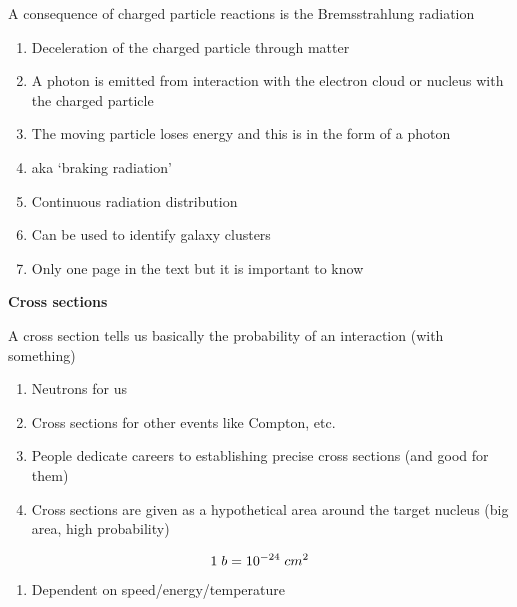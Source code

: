 \documentclass[aspectratio=1610,pdftex,dvipsnames,compress,xcolor={dvipsnames}]{beamer}
\begin{document}
\addtocounter{framenumber}{-1} 
\begin{frame}{A consequence of charged particle reactions is the Bremsstrahlung radiation}
    \begin{enumerate}[series=outerlist,topsep=0pt,itemsep=21pt,leftmargin=*,label=(\arabic*)]
        \item[]Deceleration of the charged particle through matter
        \item[]A photon is emitted from interaction with the electron cloud or nucleus with the charged particle
        \item[]The moving particle loses energy and this is in the form of a photon
        \item[]aka `braking radiation'
        \item[]Continuous radiation distribution
        \item[]Can be used to identify galaxy clusters
        \item[]Only one page in the text but it is important to know
    \end{enumerate}
\end{frame}


\begin{frame}[plain]{}
    \centering\LARGE\textbf{Cross sections}
\end{frame}


\addtocounter{framenumber}{-1} 
\begin{frame}{A cross section tells us basically the probability of an interaction (with something)}
    \begin{enumerate}[series=outerlist,topsep=0pt,itemsep=21pt,leftmargin=*,label=(\arabic*)]
        \item[]Neutrons for us
        \item[]Cross sections for other events like Compton, etc.
        \item[]People dedicate careers to establishing precise cross sections (and good for them)
        \item[]Cross sections are given as a hypothetical area  around the target nucleus (big area, high probability)
    \end{enumerate}

    \vspace*{\fill}

    \begin{equation}
        \LARGE
        1 \; b = 10^{-24} \; cm^2
    \end{equation}

    \vspace*{\fill}

    \begin{enumerate}[series=outerlist,topsep=0pt,itemsep=21pt,leftmargin=*,label=(\arabic*)]
        \item[]Dependent on speed/energy/temperature
    \end{enumerate}
\end{frame}
\end{document}
